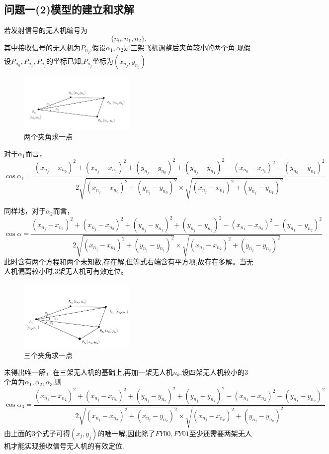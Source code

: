 \documentclass[withoutpreface,bwprint]{cumcmthesis} %
\begin{document}
\subsection{问题一(2)模型的建立和求解}
若发射信号的无人机编号为$$\{n_0,n_1,n_2\},$$其中接收信号的无人机为$P_{n_j}$,假设$\alpha_1,\alpha_2$是三架飞机调整后夹角较小的两个角,现假设$P_{n_0},P_{n_1},P_{n_j}$的坐标已知,$P_{n_j}$坐标为$(x_{n_j},y_{n_j})$
\begin{figure}[H]
	\centering
	\includegraphics[width=0.5\textwidth]{4}
	\caption{两个夹角求一点}
	\label{5}
\end{figure}
对于$\alpha_1$而言，
$$\cos \alpha_1 =\frac{{(x_{n_j}-x_{n_0})^{2}}+{(x_{n_j}-x_{n_1})^{2}}+{(y_{n_j}-y_{n_0})^{2}}+{(y_{n_j}-y_{n_1})^{2}}-{(x_{n_0}-x_{n_1})^{2}}-{(y_{n_0}-y_{n_1})^{2}} }{2\sqrt{(x_{n_j}-x_{n_0})^{2}+(y_{n_j}-y_{n_0})^{2}}\times \sqrt{(x_{n_j}-x_{n_1})^{2}+(y_{n_j}-y_{n_1})^{2}}  }$$ 

同样地，对于$\alpha_2$而言，
$$\cos \alpha =\frac{{(x_{n_j}-x_{n_1})^{2}}+{(x_{n_j}-x_{n_2})^{2}}+{(y_{n_j}-y_{n_1})^{2}}+{(y_{n_j}-y_{n_2})^{2}}-{(x_{n_1}-x_{n_2})^{2}}-{(y_{n_1}-y_{n_2})^{2}} }{2\sqrt{(x_{n_j}-x_{n_1})^{2}+(y_{n_j}-y_{n_1})^{2}}\times \sqrt{(x_{n_j}-x_{n_2})^{2}+(y_{n_j}-y_{n_2})^{2}}  }$$
此时含有两个方程和两个未知数,存在解,但等式右端含有平方项,故存在多解。当无人机偏离较小时,3架无人机可有效定位。
\begin{figure}[H]
	\centering
	\includegraphics[width=0.5\textwidth]{5}
	\caption{三个夹角求一点}
	\label{5}
\end{figure}
未得出唯一解，在三架无人机的基础上,再加一架无人机$n_k$,设四架无人机较小的3个角为$\alpha_1,\alpha_2,\alpha_3$,则
$$\cos \alpha_3 =\frac{{(x_{n_j}-x_{n_2})^{2}}+{(x_{n_j}-x_{n_k})^{2}}+{(y_{n_j}-y_{n_2})^{2}}+{(y_{n_j}-y_{n_k})^{2}}-{(x_{n_1}-x_{n_2})^{2}}-{(y_{n_1}-y_{n_2})^{2}} }{2\sqrt{(x_{n_j}-x_{n_2})^{2}+(x_{n_j}-y_{n_2})^{2}}\times \sqrt{(x_{n_j}-x_{n_k})^{2}+(y_{n_j}-y_{n_k})^{2}}  }$$
由上面的3个式子可得$(x_j,y_j)$的唯一解,因此除了$FY00,FY01$至少还需要两架无人机才能实现接收信号无人机的有效定位.
\end{document}
